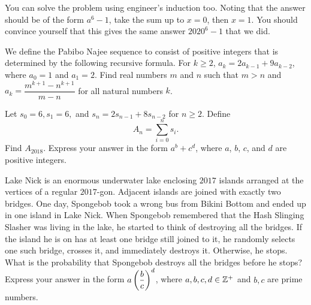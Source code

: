 \documentclass[11pt,paper=letter]{scrartcl}
\begin{document}
\begin{exrboxed}
  You can solve the problem using engineer's induction too. Noting that the answer should be of the form $a^6 - 1$, take the sum up to $x = 0$, then $x = 1$. You should convince yourself that this gives the same answer $2020^6 - 1$ that we did.
\end{exrboxed}

\begin{mdframed}[style=exmdbox]

\begin{problem}[Mathira 2018/T3-2]
  We define the Pabibo Najee sequence to consist of positive integers that is determined by the following recursive formula. For $k \ge 2$, $a_k = 2a_{k-1} + 9a_{k-2}$, where $a_0 = 1$ and $a_1 = 2$. Find real numbers $m$ and $n$ such that $m > n$ and $a_k = \dfrac{m^{k+1} - n^{k+1}}{m - n}$ for all natural numbers $k$.
\end{problem}

\begin{problem}
  Let $s_0 = 6, s_1 = 6,$ and $s_n = 2s_{n-1} + 8s_{n-2}$ for $n \geq 2$. Define $$A_n = \sum_{i=0}^n s_i.$$ Find $A_{2018}$. Express your answer in the form $a^b + c^d$, where $a$, $b$, $c$, and $d$ are positive integers.
\end{problem}

\begin{problem}
  Lake Nick is an enormous underwater lake enclosing $2017$ islands arranged at the vertices of a regular $2017$-gon. Adjacent islands are joined with exactly two bridges. One day, Spongebob took a wrong bus from Bikini Bottom and ended up in one island in Lake Nick. When Spongebob remembered that the Hash Slinging Slasher was living in the lake, he started to think of destroying all the bridges. If the island he is on has at least one bridge still joined to it, he randomly selects one such bridge, crosses it, and immediately destroys it. Otherwise, he stops. What is the probability that Spongebob destroys all the bridges before he stops? Express your answer in the form $a\left( \dfrac b c \right)^d$, where $a,b,c,d \in \mathbb Z^+$ and $b, c$ are prime numbers. \hint{\ref{h:10}} %
\end{problem}


\end{mdframed}
\end{document}
